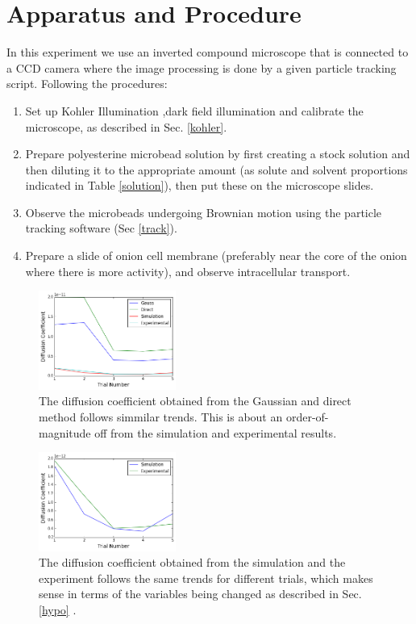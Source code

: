 \documentclass[iop,revtex4]{emulateapj_mod}
\begin{document}
\section{Apparatus and Procedure}\label{sec:ap}
In this experiment we use an inverted compound microscope that is connected to a CCD camera where the image processing is done by a given particle tracking script. Following the procedures:
\begin{enumerate}
\item Set up Kohler Illumination ,dark field illumination and calibrate the microscope, as described in Sec. \ref{kohler}.
\item Prepare polyesterine microbead solution by first creating a stock solution and then diluting it to the appropriate amount (as solute and solvent proportions indicated in Table \ref{solution}), then put these on the microscope slides.
\item Observe the microbeads undergoing Brownian motion using the particle tracking software (Sec \ref{track}).
\item Prepare a slide of onion cell membrane (preferably near the core of the onion where there is more activity), and observe intracellular transport.
\end{enumerate}
\begin{figure}[h]
\includegraphics[width=0.40\textwidth]{plots/analysis.png}
\caption{The diffusion coefficient obtained from the Gaussian and direct method follows simmilar trends. This is about an order-of-magnitude off from the simulation and experimental results.}
\label{analysis4}
\end{figure}

\begin{figure}[h]
\includegraphics[width=0.40\textwidth]{plots/exp_sim.png}
\caption{The diffusion coefficient obtained from the simulation and the experiment follows the same trends for different trials, which makes sense in terms of the variables being changed as described in Sec.\ref{hypo} . }
\label{analysis4}
\end{figure}
\end{document}
